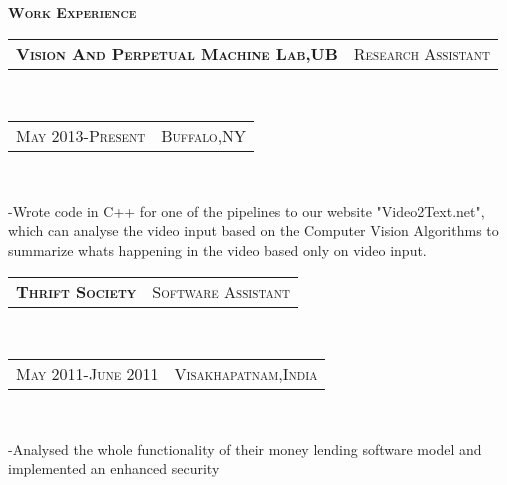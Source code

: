\documentclass[10pt,a4paper,oneside]{article}
\begin{document}
    \begin{minipage}[t]{0.63\textwidth}
        \vspace{0pt}
        \textcolor{light-gray}{\textbf{\large W\textsc{ork} E\textsc{xperience}}}
        \vspace{10pt}\\
        \begin{tabular}{c|c}
            \textbf{\normalsize V\textsc{ision} A\textsc{nd} P\textsc{erpetual} M\textsc{achine} L\textsc{ab},UB}
            &\textmd{\normalsize R\textsc{esearch} A\textsc{ssistant}}
        \end{tabular}\\
        \textcolor{light-gray}{
            \begin{tabular}{c|c}
                {\small M\textsc{ay 2013}-P\textsc{resent}}
               &{\small B\textsc{uffalo},NY}
            \end{tabular}
        }\\ 
        \vspace{-4mm}
        \begin{adjustwidth}{7pt}{0pt}
        {\footnotesize -Wrote code in C++ for one of the pipelines to our website "Video2Text.net", which can analyse 
    the video input based on the Computer Vision Algorithms to
summarize whats happening in the video based only on video input.}\\
        \end{adjustwidth}
        \begin{tabular}{c|c}
            \textbf{\normalsize T\textsc{hrift} S\textsc{ociety}}
            &\textmd{\normalsize S\textsc{oftware} A\textsc{ssistant}}
        \end{tabular}\\
        \textcolor{light-gray}{
            \begin{tabular}{c|c}
                {\small M\textsc{ay 2011}-J\textsc{une 2011}}
                &{\small V\textsc{isakhapatnam},I\textsc{ndia}}
            \end{tabular}
        }\\ 
        \vspace{-4mm}
        \begin{adjustwidth}{7pt}{0pt}
        {\footnotesize -Analysed the whole functionality of their money lending software model and implemented an enhanced security
}
\end{adjustwidth}
\end{minipage}
\end{document}
